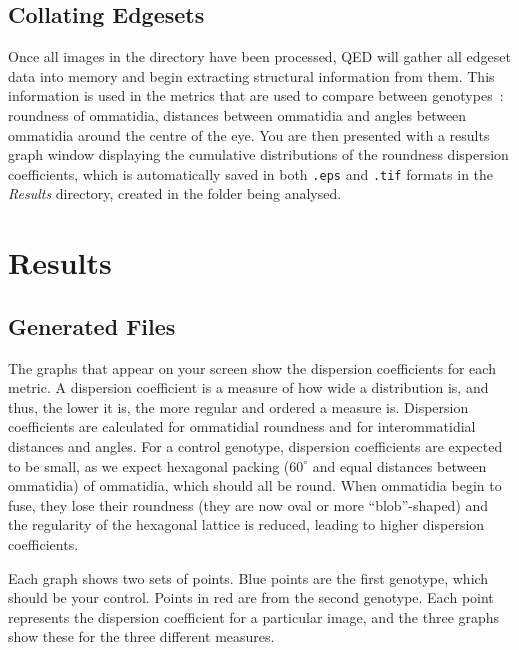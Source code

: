 \documentclass[a4paper,11pt]{article}
\begin{document}
\subsection{Collating Edgesets}
Once all images in the directory have been processed, QED will gather all edgeset data into memory and begin extracting structural information from them. This information is used in the metrics that are used to compare between genotypes~: roundness of ommatidia, distances between ommatidia and angles between ommatidia around the centre of the eye. You are then presented with a results graph window displaying the cumulative distributions of the roundness dispersion coefficients, which is automatically saved in both \texttt{.eps} and \texttt{.tif} formats in the \textit{Results} directory, created in the folder being analysed.










\newpage
\section{Results}

\subsection{Generated Files}
The graphs that appear on your screen show the dispersion coefficients for each metric. A dispersion coefficient is a measure of how wide a distribution is, and thus, the lower it is, the more regular and ordered a measure is. Dispersion coefficients are calculated for ommatidial roundness and for interommatidial distances and angles. For a control genotype, dispersion coefficients are expected to be small, as we expect hexagonal packing ($60^\circ$ and equal distances between ommatidia) of ommatidia, which should all be round. When ommatidia begin to fuse, they lose their roundness (they are now oval or more ``blob''-shaped) and the regularity of the hexagonal lattice is reduced, leading to higher dispersion coefficients.

Each graph shows two sets of points. Blue points are the first genotype, which should be your control. Points in red are from the second genotype. Each point represents the dispersion coefficient for a particular image, and the three graphs show these for the three different measures.
\end{document}
